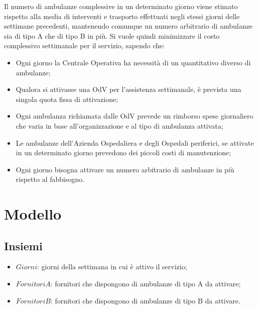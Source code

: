 \documentclass[10pt, a4paper]{article}
\begin{document}
Il numero di ambulanze complessive in un determinato giorno viene stimato rispetto alla media di interventi e trasporto effettuati negli stessi giorni delle settimane precedenti, mantenendo comunque un numero arbitrario di ambulanze sia di tipo A che di tipo B in più.
\newline \newline
Si vuole quindi minimizzare il costo complessivo settimanale per il servizio, sapendo che:
\begin{itemize}
    \item Ogni giorno la Centrale Operativa ha necessità di un quantitativo diverso di ambulanze;
    \item Qualora si attivasse una OdV per l'assistenza settimanale, è prevista una singola quota fissa di attivazione;
    \item Ogni ambulanza richiamata dalle OdV prevede un rimborso spese giornaliero che varia in base all'organizzazione e al tipo di ambulanza attivata;
    \item Le ambulanze dell'Azienda Ospedaliera e degli Ospedali periferici, se attivate in un determinato giorno prevedono dei piccoli costi di manutenzione;
    \item Ogni giorno bisogna attivare un numero arbitrario di ambulanze in più rispetto al fabbisogno.
\end{itemize}
\newpage
\section{Modello}
\subsection{Insiemi}
\begin{itemize}
    \item $Giorni$: giorni della settimana in cui è attivo il servizio;
    \item $FornitoriA$: fornitori che dispongono di ambulanze di tipo A da attivare;
    \item $FornitoriB$: fornitori che dispongono di ambulanze di tipo B da attivare.
\end{itemize}
\end{document}

